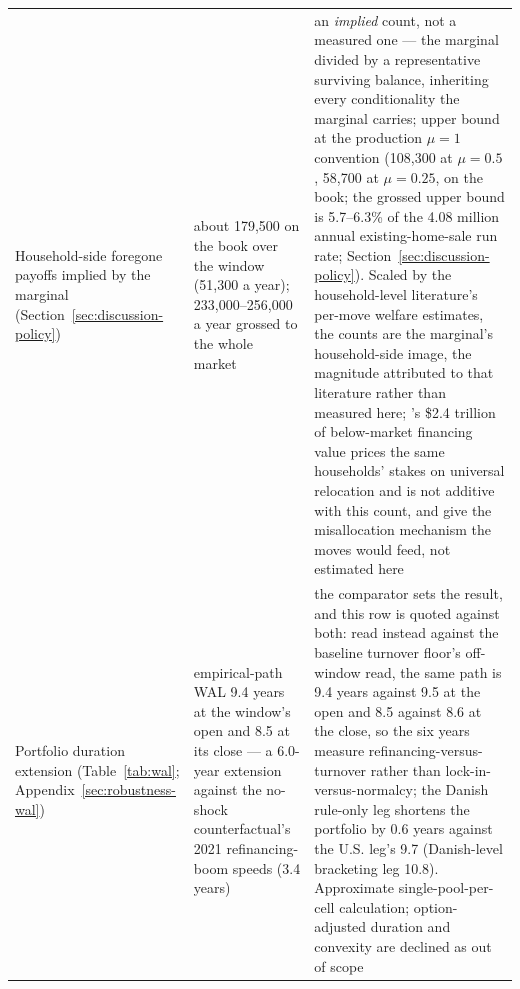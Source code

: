 \documentclass[12pt]{article}
\begin{document}
{\begin{longtable}{@{}p{4.6cm}p{4.6cm}p{5.3cm}@{}}
\addlinespace
Household-side foregone payoffs implied by the marginal (Section~\ref{sec:discussion-policy}) & about 179{,}500 on the book over the window (51{,}300 a year); 233{,}000--256{,}000 a year grossed to the whole market & an \emph{implied} count, not a measured one --- the marginal divided by a representative surviving balance, inheriting every conditionality the marginal carries; upper bound at the production $\mu = 1$ convention (108{,}300 at $\mu = 0.5$, 58{,}700 at $\mu = 0.25$, on the book; the grossed upper bound is 5.7--6.3\% of the 4.08 million annual existing-home-sale run rate; Section~\ref{sec:discussion-policy}). Scaled by the household-level literature's per-move welfare estimates, the counts are the marginal's household-side image, the magnitude attributed to that literature \citep{gerardi2024} rather than measured here; \citet{batzer2024}'s \$2.4 trillion of below-market financing value prices the same households' stakes on universal relocation and is not additive with this count, and \citet{hsieh2019} give the misallocation mechanism the moves would feed, not estimated here \\
\addlinespace
Portfolio duration extension (Table~\ref{tab:wal}; Appendix~\ref{sec:robustness-wal}) & empirical-path WAL 9.4 years at the window's open and 8.5 at its close --- a 6.0-year extension against the no-shock counterfactual's 2021 refinancing-boom speeds (3.4 years) & the comparator sets the result, and this row is quoted against both: read instead against the baseline turnover floor's off-window read, the same path is 9.4 years against 9.5 at the open and 8.5 against 8.6 at the close, so the six years measure refinancing-versus-turnover rather than lock-in-versus-normalcy; the Danish rule-only leg shortens the portfolio by 0.6 years against the U.S. leg's 9.7 (Danish-level bracketing leg 10.8). Approximate single-pool-per-cell calculation; option-adjusted duration and convexity are declined as out of scope \\
\bottomrule
\end{longtable}
}

\end{document}
